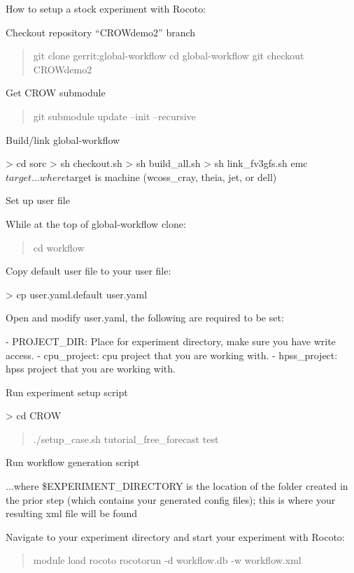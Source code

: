 How to setup a stock experiment with Rocoto\-:

Checkout repository “\-C\-R\-O\-Wdemo2” branch

\begin{quotation}
git clone gerrit\-:global-\/workflow cd global-\/workflow git checkout C\-R\-O\-Wdemo2

\end{quotation}


Get C\-R\-O\-W submodule

\begin{quotation}
git submodule update --init --recursive

\end{quotation}


Build/link global-\/workflow \begin{DoxyVerb}> cd sorc
> sh checkout.sh
> sh build_all.sh
> sh link_fv3gfs.sh emc $target
...where $target is machine (wcoss_cray, theia, jet, or dell)
\end{DoxyVerb}


Set up user file

While at the top of global-\/workflow clone\-: \begin{quotation}
cd workflow

\end{quotation}
Copy default user file to your user file\-: \begin{DoxyVerb}> cp user.yaml.default user.yaml
\end{DoxyVerb}
 Open and modify user.\-yaml, the following are required to be set\-: \begin{DoxyVerb}- PROJECT_DIR: Place for experiment directory, make sure you have write access.
- cpu_project: cpu project that you are working with.
- hpss_project: hpss project that you are working with.
\end{DoxyVerb}


Run experiment setup script \begin{DoxyVerb}> cd CROW
\end{DoxyVerb}
 \begin{quotation}
./setup\-\_\-case.sh tutorial\-\_\-free\-\_\-forecast test

\end{quotation}


Run workflow generation script 


...where \$\-E\-X\-P\-E\-R\-I\-M\-E\-N\-T\-\_\-\-D\-I\-R\-E\-C\-T\-O\-R\-Y is the location of the folder created in the prior step (which contains your generated config files); this is where your resulting xml file will be found

Navigate to your experiment directory and start your experiment with Rocoto\-:

\begin{quotation}
module load rocoto rocotorun -\/d workflow.\-db -\/w workflow.\-xml \end{quotation}
